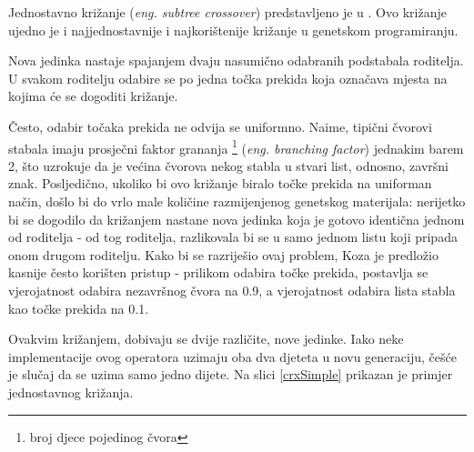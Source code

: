 Jednostavno križanje (\textit{eng. subtree crossover}) predstavljeno je u \cite{crxSimple}. Ovo križanje ujedno je i najjednostavnije i najkorištenije križanje u genetskom programiranju.

Nova jedinka nastaje spajanjem dvaju nasumično odabranih podstabala roditelja. U svakom roditelju odabire se po jedna točka prekida koja označava mjesta na kojima će se dogoditi križanje.

Često, odabir točaka prekida ne odvija se uniformno. Naime, tipični čvorovi stabala imaju prosječni faktor grananja \footnote{broj djece pojedinog čvora} (\textit{eng. branching factor}) jednakim barem 2, što uzrokuje da je većina čvorova nekog stabla u stvari list, odnosno, završni znak. Posljedično, ukoliko bi ovo križanje biralo točke prekida na uniforman način, došlo bi do vrlo male količine razmijenjenog genetskog materijala: nerijetko bi se dogodilo da križanjem nastane nova jedinka koja je gotovo identična jednom od roditelja - od tog roditelja, razlikovala bi se u samo jednom listu koji pripada onom drugom roditelju. Kako bi se razriješio ovaj problem, Koza \cite{koza} je predložio kasnije često korišten pristup - prilikom odabira točke prekida, postavlja se vjerojatnost odabira nezavršnog čvora na 0.9, a vjerojatnost odabira lista stabla kao točke prekida na 0.1.

Ovakvim križanjem, dobivaju se dvije različite, nove jedinke. Iako neke implementacije ovog operatora uzimaju oba dva djeteta u novu generaciju, češće je slučaj da se uzima samo jedno dijete. Na slici \ref{crxSimple} prikazan je primjer jednostavnog križanja.

